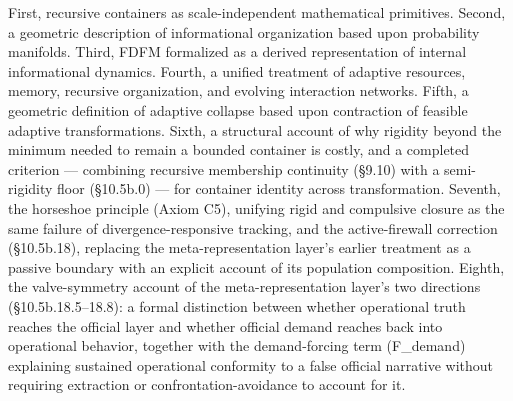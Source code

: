 \documentclass[
]{article}
\begin{document}
First, recursive containers as scale-independent mathematical
primitives. Second, a geometric description of informational
organization based upon probability manifolds. Third, FDFM formalized as
a derived representation of internal informational dynamics. Fourth, a
unified treatment of adaptive resources, memory, recursive organization,
and evolving interaction networks. Fifth, a geometric definition of
adaptive collapse based upon contraction of feasible adaptive
transformations. Sixth, a structural account of why rigidity beyond the
minimum needed to remain a bounded container is costly, and a completed
criterion --- combining recursive membership continuity (§9.10) with a
semi-rigidity floor (§10.5b.0) --- for container identity across
transformation. Seventh, the horseshoe principle (Axiom C5), unifying
rigid and compulsive closure as the same failure of
divergence-responsive tracking, and the active-firewall correction
(§10.5b.18), replacing the meta-representation layer's earlier treatment
as a passive boundary with an explicit account of its population
composition. Eighth, the valve-symmetry account of the
meta-representation layer's two directions (§10.5b.18.5--18.8): a formal
distinction between whether operational truth reaches the official layer
and whether official demand reaches back into operational behavior,
together with the demand-forcing term (F\_demand) explaining sustained
operational conformity to a false official narrative without requiring
extraction or confrontation-avoidance to account for it.
\end{document}
